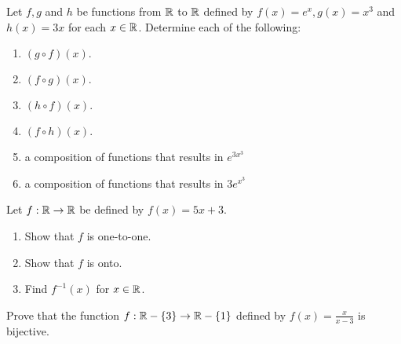 \documentclass{homework}
\begin{document}
\question Let $f, g$ and $h$ be functions from $\mathbb{R}$ to $\mathbb{R}$ deﬁned by $f(x) = e^x, g(x) = x^3$ and $h(x) = 3x$ for each $x \in \mathbb{R}$. Determine each of the following:
\begin{enumerate}[label=(\alph*)]
    \item $(g \circ f )(x).$
    \item $(f \circ g)(x).$
    \item $(h \circ f )(x).$
    \item $(f \circ h)(x).$
    \item a composition of functions that results in $e^{3x^3}$
    \item a composition of functions that results in $3e^{x^3}$
\end{enumerate}

\question Let $f: \mathbb{R} \rightarrow \mathbb{R}$ be deﬁned by $f(x) = 5x + 3$.
\begin{enumerate}
    \item Show that $f$ is one-to-one.
    \item Show that $f$ is onto.
    \item Find $f^{-1}(x)$ for $x \in \mathbb{R}$.
\end{enumerate}

\question Prove that the function $f:\mathbb{R}-\{3\} \rightarrow \mathbb{R} - \{1\}$ deﬁned by $f(x)=\frac{x}{x-3}$ is bijective.

\end{document}
